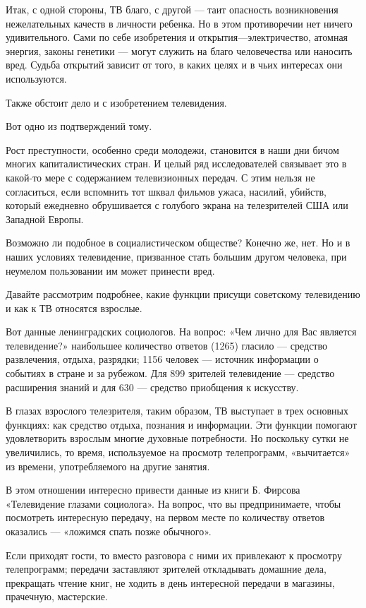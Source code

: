 \documentclass[12pt, a4paper, openany]{book}
\begin{document}
Итак, с одной стороны, ТВ благо, с другой — таит опасность возникновения нежелательных качеств в личности ребенка. Но в этом противоречии нет ничего удивительного. Сами по себе изобретения и открытия—электричество, атомная энергия, законы генетики — могут служить на благо человечества или наносить вред. Судьба открытий зависит от того, в каких целях и в чьих интересах они используются. 

Также обстоит дело и с изобретением телевидения. 

Вот одно из подтверждений тому. 

Рост преступности, особенно среди молодежи, становится в наши дни бичом многих капиталистических стран. И целый ряд исследователей связывает это в какой-то мере с содержанием телевизионных передач. С этим нельзя не согласиться, если вспомнить тот шквал фильмов ужаса, насилий, убийств, который ежедневно обрушивается с голубого экрана на телезрителей США или Западной Европы. 

Возможно ли подобное в социалистическом обществе? Конечно же, нет. Но и в наших условиях телевидение, призванное стать большим другом человека, при неумелом пользовании им может принести вред. 

Давайте рассмотрим подробнее, какие функции присущи советскому телевидению и как к ТВ относятся взрослые. 

Вот данные ленинградских социологов. На вопрос: «Чем лично для Вас является телевидение?» наибольшее количество ответов (1265) гласило — средство развлечения, отдыха, разрядки; 1156 человек — источник информации о событиях в стране и за рубежом. Для 899 зрителей телевидение — средство расширения знаний и для 630 — средство приобщения к искусству. 

В глазах взрослого телезрителя, таким образом, ТВ выступает в трех основных функциях: как средство отдыха, познания и информации. Эти функции помогают удовлетворить взрослым многие духовные потребности. Но поскольку сутки не увеличились, то время, используемое на просмотр телепрограмм, «вычитается» из времени, употребляемого на другие занятия. 

В этом отношении интересно привести данные из книги Б. Фирсова «Телевидение глазами социолога». На вопрос, что вы предпринимаете, чтобы посмотреть интересную передачу, на первом месте по количеству ответов оказались — «ложимся спать позже обычного». 

Если приходят гости, то вместо разговора с ними их привлекают к просмотру телепрограмм; передачи заставляют зрителей откладывать домашние дела, прекращать чтение книг, не ходить в день интересной передачи в магазины, прачечную, мастерские. 
\end{document}
